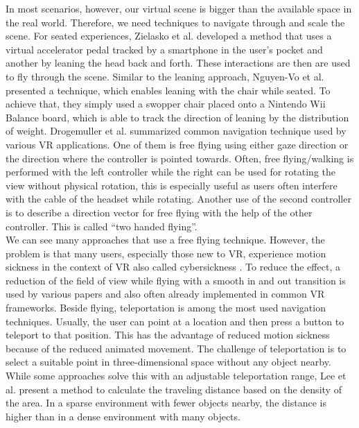 In most scenarios, however, our virtual scene is bigger than the available space in the real world. Therefore, we need techniques to navigate through and scale the scene. For seated experiences, Zielasko et al. \cite{zielasko_remain_2017} developed a method that uses a virtual accelerator pedal tracked by a smartphone in the user's pocket and another by leaning the head back and forth. These interactions are then are used to fly through the scene. Similar to the leaning approach, Nguyen-Vo et al. \cite{nguyen-vo_simulated_2018} presented a technique, which enables leaning with the chair while seated. To achieve that, they simply used a swopper chair placed onto a Nintendo Wii Balance board, which is able to track the direction of leaning by the distribution of weight.  
Drogemuller et al. \cite{drogemuller_examining_2020} summarized common navigation technique used by various VR applications. One of them is free flying using either gaze direction or the direction where the controller is pointed towards. Often, free flying/walking is performed with the left controller while the right can be used for rotating the view without physical rotation, this is especially useful as users often interfere with the cable of the headset while rotating. Another use of the second controller is to describe a direction vector for free flying with the help of the other controller. This is called “two handed flying”.\\
We can see many approaches that use a free flying technique. However, the problem is that many users, especially those new to VR, experience motion sickness in the context of VR also called cybersickness \cite{zielasko_remain_2017}.
To reduce the effect, a reduction of the field of view while flying with a smooth in and out transition is used by various papers and also often already implemented in common VR frameworks.
Beside flying, teleportation is among the most used navigation techniques. Usually, the user can point at a location and then press a button to teleport to that position.
This has the advantage of reduced motion sickness because of the reduced animated movement. The challenge of teleportation is to select a suitable point in three-dimensional space without any object nearby. While some approaches solve this with an adjustable teleportation range, Lee et al. \cite{lee_evaluating_2020} present a method to calculate the traveling distance based on the density of the area. In a sparse environment with fewer objects nearby, the distance is higher than in a dense environment with many objects.
